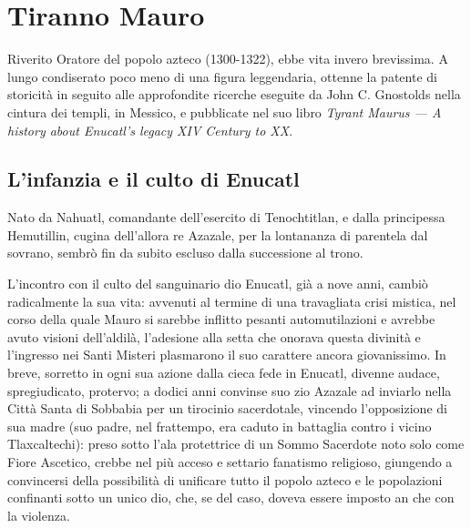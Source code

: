 \documentclass[italian,a4paper]{article}
\begin{document}
\section*{Tiranno Mauro}
 Riverito Oratore del popolo azteco (1300-1322), ebbe vita
 invero brevissima. A lungo condiserato poco meno di una figura
 leggendaria, ottenne la patente di storicità in seguito alle approfondite
 ricerche eseguite da John C. Gnostolds nella cintura dei templi, in
 Messico, e pubblicate nel suo libro \emph{Tyrant Maurus --- A history about
 Enucatl's legacy XIV Century to XX}.
 \subsection*{L'infanzia e il culto di Enucatl}
 Nato da Nahuatl, comandante dell'esercito di Tenochtitlan, e dalla
 principessa Hemutillin, cugina dell'allora re Azazale, per la lontananza di
 parentela dal sovrano, sembrò fin da subito escluso dalla successione al
 trono.

 L'incontro con il culto del sanguinario dio Enucatl, già a nove anni,
 cambiò radicalmente la sua vita: avvenuti al termine di una travagliata
 crisi mistica, nel corso della quale Mauro si sarebbe inflitto pesanti
 automutilazioni e avrebbe avuto visioni dell'aldilà, l'adesione alla setta
 che onorava questa divinità e l'ingresso nei Santi Misteri plasmarono il
 suo carattere ancora giovanissimo. In breve, sorretto in ogni sua azione
 dalla cieca fede in Enucatl, divenne audace, spregiudicato, protervo; a
 dodici anni convinse suo zio Azazale ad inviarlo nella Città Santa di
 Sobbabia per un tirocinio sacerdotale, vincendo l'opposizione di sua madre
 (suo padre, nel frattempo, era caduto in battaglia contro i vicino
 Tlaxcaltechi): preso sotto l'ala protettrice di un Sommo Sacerdote noto
 solo come Fiore Ascetico, crebbe nel più acceso e settario fanatismo
 religioso, giungendo a convincersi della possibilità di unificare tutto il
 popolo azteco e le popolazioni confinanti sotto un unico dio, che, se del
 caso, doveva essere imposto an che con la violenza.
\end{document}
